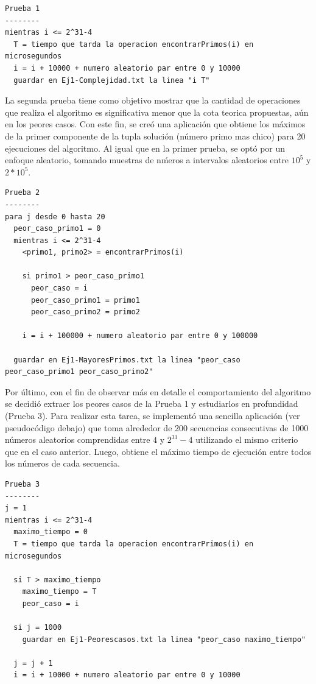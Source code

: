 \documentclass[a4paper,10pt] {article}
\begin{document}
\begin{verbatim}
Prueba 1
--------
mientras i <= 2^31-4
  T = tiempo que tarda la operacion encontrarPrimos(i) en microsegundos
  i = i + 10000 + numero aleatorio par entre 0 y 10000
  guardar en Ej1-Complejidad.txt la linea "i T"
\end{verbatim}

La segunda prueba tiene como objetivo mostrar que la cantidad de operaciones que realiza el algoritmo es significativa menor que la cota teorica propuestas, a\'un en los peores casos. Con este fin, se cre\'o una aplicaci\'on que obtiene los m\'aximos de la primer componente de la tupla soluci\'on (n\'umero primo mas chico) para 20 ejecuciones del algoritmo. Al igual que en la primer prueba, se opt\'o por un enfoque aleatorio, tomando muestras de n\'meros a intervalos aleatorios entre $10^{5}$ y $2*10^{5}$.

\begin{verbatim}
Prueba 2
--------
para j desde 0 hasta 20
  peor_caso_primo1 = 0
  mientras i <= 2^31-4
    <primo1, primo2> = encontrarPrimos(i)

    si primo1 > peor_caso_primo1
      peor_caso = i
      peor_caso_primo1 = primo1
      peor_caso_primo2 = primo2

    i = i + 100000 + numero aleatorio par entre 0 y 100000

  guardar en Ej1-MayoresPrimos.txt la linea "peor_caso peor_caso_primo1 peor_caso_primo2"
\end{verbatim}

Por \'ultimo, con el fin de observar m\'as en detalle el comportamiento del algoritmo se decidi\'o extraer los peores casos de la Prueba 1 y estudiarlos en profundidad (Prueba 3). Para realizar esta tarea, se implement\'o una sencilla aplicaci\'on (ver pseudoc\'odigo debajo) que toma alrededor de 200 secuencias consecutivas de 1000 n\'umeros aleatorios comprendidas entre $4$ y $2^{31}-4$ utilizando el mismo criterio que en el caso anterior. Luego, obtiene el m\'aximo tiempo de ejecuci\'on entre todos los n\'umeros de cada secuencia. 

\begin{verbatim}
Prueba 3
--------
j = 1
mientras i <= 2^31-4
  maximo_tiempo = 0
  T = tiempo que tarda la operacion encontrarPrimos(i) en microsegundos

  si T > maximo_tiempo
    maximo_tiempo = T
    peor_caso = i

  si j = 1000
    guardar en Ej1-Peorescasos.txt la linea "peor_caso maximo_tiempo"
  
  j = j + 1
  i = i + 10000 + numero aleatorio par entre 0 y 10000
\end{verbatim}
\end{document}
